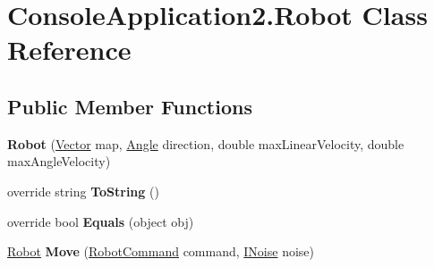 \hypertarget{class_console_application2_1_1_robot}{}\section{Console\+Application2.\+Robot Class Reference}
\label{class_console_application2_1_1_robot}
\subsection*{Public Member Functions}
\begin{DoxyCompactItemize}
\item 
\hypertarget{class_console_application2_1_1_robot_a7d8dd4df2d0731601425fbd70a33387b}{}{\bfseries Robot} (\hyperlink{class_console_application2_1_1_vector}{Vector} map, \hyperlink{class_console_application2_1_1_angle}{Angle} direction, double max\+Linear\+Velocity, double max\+Angle\+Velocity)\label{class_console_application2_1_1_robot_a7d8dd4df2d0731601425fbd70a33387b}

\item 
\hypertarget{class_console_application2_1_1_robot_a60d751f9edb2e4307bf21066d1ac37d3}{}override string {\bfseries To\+String} ()\label{class_console_application2_1_1_robot_a60d751f9edb2e4307bf21066d1ac37d3}

\item 
\hypertarget{class_console_application2_1_1_robot_a88aaceddaf860b7795cb0c786e591b4c}{}override bool {\bfseries Equals} (object obj)\label{class_console_application2_1_1_robot_a88aaceddaf860b7795cb0c786e591b4c}

\item 
\hypertarget{class_console_application2_1_1_robot_a7dd87bf55a21d40f9672e4f6f8295249}{}\hyperlink{class_console_application2_1_1_robot}{Robot} {\bfseries Move} (\hyperlink{class_console_application2_1_1_robot_command}{Robot\+Command} command, \hyperlink{interface_console_application2_1_1_i_noise}{I\+Noise} noise)\label{class_console_application2_1_1_robot_a7dd87bf55a21d40f9672e4f6f8295249}

\end{DoxyCompactItemize}

